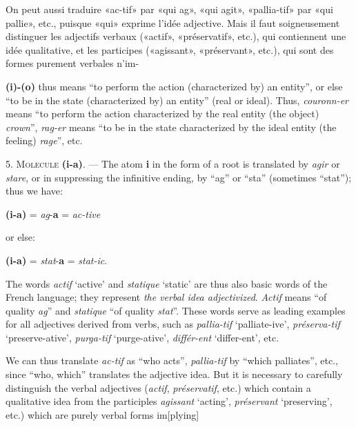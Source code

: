 \begin{sloppypar}
{     On peut aussi traduire «ac-tif» par «qui ag», «qui agit»,
     «pallia-tif» par «qui pallie», etc., puisque «qui» exprime l’idée
     adjective. Mais il faut soigneusement distinguer les adjectifs
     verbaux («actif», «préservatif», etc.), qui contiennent une idée
     qualitative, et les participes («agissant», «préservant», etc.),
     qui sont des formes purement verbales n’im-

   }
   {\noindent \textbf{(i)-(o)} thus means ``to perform the action
     (characterized by) an entity'', or else ``to be in the state
     (characterized by) an entity'' (real or ideal). Thus,
     \emph{couronn-er} means ``to perform the action characterized by the
     real entity (the object) \emph{crown}'', \emph{rag-er} means ``to be
     in the state characterized by the ideal entity (the feeling)
     \emph{rage}'', etc.

     5. \textsc{Molecule} \textbf{(i-a)}. --- The atom \textbf{i} in
     the form of a root is translated by \emph{agir} or \emph{stare}, or in
     suppressing the infinitive ending, by ``ag'' or ``sta''
     (sometimes ``stat''); thus we have:

     \begin{center}
       \textbf{(i-a)} = \emph{ag}-\textbf{a} = \emph{ac-tive}
     \end{center}
     or else:
     \begin{center}
       \textbf{(i-a)} = \emph{stat}-\textbf{a} = \emph{stat-ic}.
     \end{center}

     The words \emph{actif} `active' and \emph{statique} `static' are
     thus also basic words of the French language; they represent
     \emph{the verbal idea adjectivized}. \emph{Actif} means ``of
     quality \emph{ag}'' and \emph{statique} ``of quality
     \emph{stat}''. These words serve as leading examples for all
     adjectives derived from verbs, such as \emph{pallia-tif}
     `palliate-ive', \emph{préserva-tif} `preserve-ative',
     \emph{purga-tif} `purge-ative', \emph{différ-ent} `differ-ent',
     etc.

     We can thus translate \emph{ac-tif} as ``who acts'', \emph{pallia-tif}
     by ``which palliates'', etc., since ``who, which'' translates the
     adjective idea. But it is necessary to carefully distinguish the
     verbal adjectives (\emph{actif}, \emph{préservatif}, etc.) which
     contain a qualitative idea from the participles \emph{agissant}
     `acting', \emph{préservant} `preserving', etc.) which are purely
     verbal forms im[plying]

}
\end{sloppypar}
